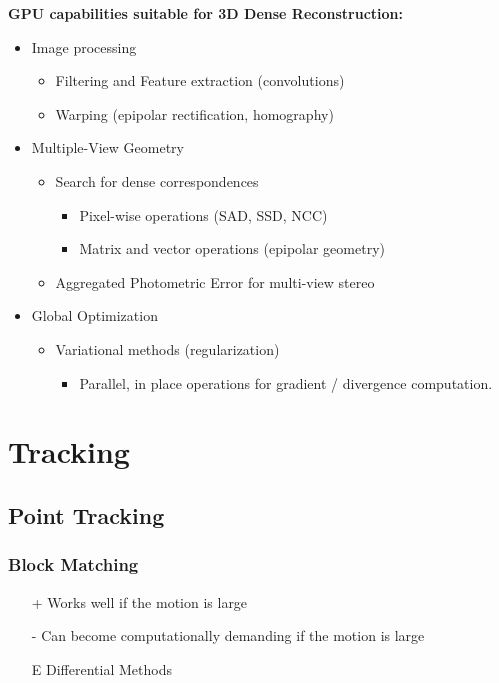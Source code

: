 \documentclass[10pt,a4paper]{scrartcl}
\begin{document}
\begin{multicols*}{2}
\textbf{GPU capabilities suitable for 3D Dense Reconstruction:}
\begin{itemize}
\item Image processing
\begin{itemize}
\item Filtering and Feature extraction (convolutions)
\item Warping (epipolar rectification, homography)
\end{itemize}
\item Multiple-View Geometry
\begin{itemize}
\item Search for dense correspondences
\begin{itemize}
\item Pixel-wise operations (SAD, SSD, NCC)
\item Matrix and vector operations (epipolar geometry)
\end{itemize}
\item Aggregated Photometric Error for multi-view stereo
\end{itemize}
\item Global Optimization
\begin{itemize}
\item Variational methods (regularization)
\begin{itemize}
\item Parallel, in place operations for gradient / divergence computation.
\end{itemize}
\end{itemize}
\end{itemize}

\section{Tracking}

\subsection{Point Tracking}

\subsubsection{Block Matching}

\begin{itemize}
\item[+] Works well if the motion is large
\item[-] Can become computationally demanding if the motion is large
\item[E] Differential Methods


\end{itemize}
\end{multicols*}
\end{document}
